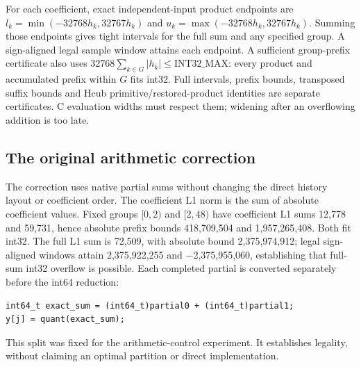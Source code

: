\documentclass[conference]{IEEEtran}
\begin{document}
For each coefficient, exact independent-input product endpoints are
\(l_k=\min(-32768h_k,32767h_k)\) and \(u_k=\max(-32768h_k,32767h_k)\).
Summing those endpoints gives tight intervals for the full sum and any
specified group. A sign-aligned legal sample window attains each
endpoint. A sufficient group-prefix certificate also uses
\(32768\sum_{k\in G}|h_k|\le\mathrm{INT32\_MAX}\): every product and
accumulated prefix within \(G\) fits int32. Full intervals, prefix
bounds, transposed suffix bounds and Hcub primitive/restored-product
identities are separate certificates. C evaluation widths must respect
them; widening after an overflowing addition is too late.

\subsection{The original arithmetic correction}\label{the-original-arithmetic-correction}

The correction uses native partial sums without changing the direct
history layout or coefficient order. The coefficient L1 norm is the sum
of absolute coefficient values. Fixed groups \([0,2)\) and \([2,48)\)
have coefficient L1 sums 12,778 and 59,731, hence absolute prefix bounds
418,709,504 and 1,957,265,408. Both fit int32. The full L1 sum is
72,509, with absolute bound 2,375,974,912; legal sign-aligned windows
attain 2,375,922,255 and −2,375,955,060, establishing that full-sum
int32 overflow is possible. Each completed partial is converted
separately before the int64 reduction:

\begin{Verbatim}[breaklines,breakanywhere,breaksymbolleft={},breaksymbolright={},fontsize=\scriptsize]
int64_t exact_sum = (int64_t)partial0 + (int64_t)partial1;
y[j] = quant(exact_sum);
\end{Verbatim}

This split was fixed for the arithmetic-control experiment. It
establishes legality, without claiming an optimal partition or direct
implementation.
\end{document}
